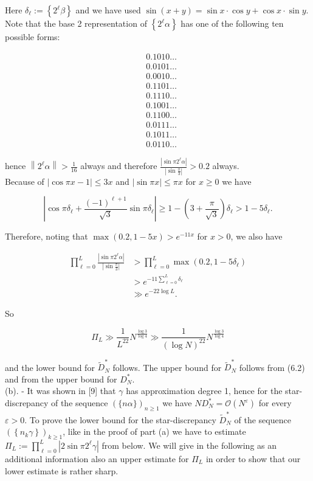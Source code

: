 \documentclass[10pt]{article}
\begin{document}
Here $\delta_{\ell}:=\left\{2^{\ell} \beta\right\}$ and we have used $\sin (x+y)=\sin x \cdot \cos y+\cos x \cdot \sin y$. Note that the base 2 representation of $\left\{2^{\ell} \alpha\right\}$ has one of the following ten possible forms:

$$
\begin{aligned}
& 0.1010 \ldots \\
& 0.0101 \ldots \\
& 0.0010 \ldots \\
& 0.1101 \ldots \\
& 0.1110 \ldots \\
& 0.1001 \ldots \\
& 0.1100 \ldots \\
& 0.0111 \ldots \\
& 0.1011 \ldots \\
& 0.0110 \ldots
\end{aligned}
$$

hence $\left\|2^{\ell} \alpha\right\|>\frac{1}{16}$ always and therefore $\frac{\left|\sin \pi 2^{\ell} \alpha\right|}{\left|\sin \frac{\pi}{3}\right|}>0.2$ always.\\
Because of $|\cos \pi x-1| \leqslant 3 x$ and $|\sin \pi x| \leqslant \pi x$ for $x \geqslant 0$ we have

$$
\left|\cos \pi \delta_{\ell}+\frac{(-1)^{\ell+1}}{\sqrt{3}} \sin \pi \delta_{\ell}\right| \geqslant 1-\left(3+\frac{\pi}{\sqrt{3}}\right) \delta_{\ell}>1-5 \delta_{\ell} .
$$

Therefore, noting that $\max (0.2,1-5 x)>e^{-11 x}$ for $x>0$, we also have

$$
\begin{aligned}
\prod_{\ell=0}^{L} \frac{\left|\sin \pi 2^{\ell} \alpha\right|}{\left|\sin \frac{\pi}{3}\right|} & >\prod_{\ell=0}^{L} \max \left(0.2,1-5 \delta_{\ell}\right) \\
& >e^{-11 \sum_{\ell=0}^{L} \delta_{\ell}} \\
& \gg e^{-22 \log L} .
\end{aligned}
$$

So

$$
\Pi_{L} \gg \frac{1}{L^{22}} N^{\frac{\log 3}{\log 4}} \gg \frac{1}{(\log N)^{22}} N^{\frac{\log 3}{\log 4}}
$$

and the lower bound for $\widetilde{D}_{N}^{*}$ follows. The upper bound for $\widetilde{D}_{N}^{*}$ follows from (6.2) and from the upper bound for $D_{N}^{*}$.\\[0pt]
(b). - It was shown in [9] that $\gamma$ has approximation degree 1, hence for the star-discrepancy of the sequence $(\{n \alpha\})_{n \geqslant 1}$ we have $N D_{N}^{*}=\mathcal{O}\left(N^{\varepsilon}\right)$ for every $\varepsilon>0$. To prove the lower bound for the star-discrepancy $\widetilde{D}_{N}^{*}$ of the sequence $\left(\left\{n_{k} \gamma\right\}\right)_{k \geqslant 1}$, like in the proof of part (a) we have to estimate $\Pi_{L}:=\prod_{\ell=0}^{L}\left|2 \sin \pi 2^{\ell} \gamma\right|$ from below. We will give in the following as an additional information also an upper estimate for $\Pi_{L}$ in order to show that our lower estimate is rather sharp.
\end{document}
